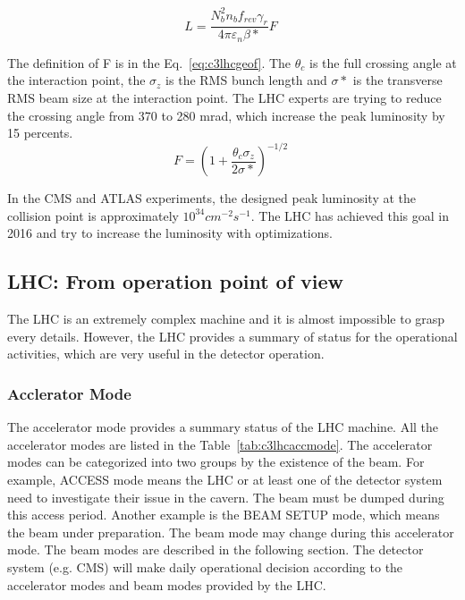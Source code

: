 \begin{equation}
 L = \frac{N^{2}_{b}n_{b}f_{rev}\gamma_{r}}{4\pi \varepsilon_{n}\beta *}F \;
 \label{eq:c3lhclumi}
\end{equation}

The definition of F is in the Eq.~\ref{eq:c3lhcgeof}. The $\theta_{c}$ is the full crossing angle at the interaction point, the $\sigma_{z}$ is the RMS bunch length and $\sigma *$ is the transverse RMS beam size at the interaction point. The LHC experts are trying to reduce the crossing angle from 370 to 280 mrad, which increase the peak luminosity by 15 percents. 
\begin{equation}
 F = (1+\frac{\theta_{c}\sigma_{z}}{2\sigma *})^{-1/2} \;
 \label{eq:c3lhcgeof}
\end{equation}

In the CMS and ATLAS experiments, the designed peak luminosity at the collision point is approximately $10^{34}cm^{-2}s^{-1}$. The LHC has achieved this goal in 2016 and try to increase the luminosity with optimizations.

\subsection{LHC: From operation point of view}

The LHC is an extremely complex machine and it is almost impossible to grasp every details. However, the LHC provides a summary of status for the operational activities, which are very useful in the detector operation.

\subsubsection{Acclerator Mode}

The accelerator mode provides a summary status of the LHC machine. All the accelerator modes are listed in the Table~\ref{tab:c3lhcaccmode}. The accelerator modes can be categorized into two groups by the existence of the beam. For example, ACCESS mode means the LHC or at least one of the detector system need to investigate their issue in the cavern. The beam must be dumped during this access period. Another example is the BEAM SETUP mode, which means the beam under preparation. The beam mode may change during this accelerator mode. The beam modes are described in the following section. The detector system (e.g. CMS) will make daily operational decision according to the accelerator modes and beam modes provided by the LHC.

